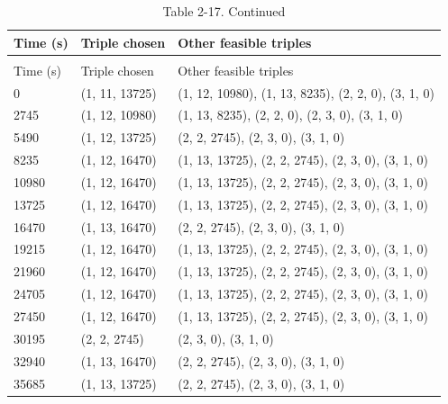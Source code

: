 \documentclass[../main.tex]{subfiles}
\begin{document}
\begin{longtable}[h!t!]{p{0.6in}p{1in}p{4.4in}}
    \caption{Duplicate of Previous table, using longtables environment.}\label{tbl2}\\%
    \hline {{Time (s)}} & {{Triple chosen}} & {{Other feasible triples}}\\ \hline \endfirsthead%
    \hline\endfoot%
    \caption*{Table 2-17. Continued} \\%
    \hline{{Time (s)}} & {{Triple chosen}} & {{Other feasible triples}}\\ \hline \endhead%
0 & (1, 11, 13725) & (1, 12, 10980), (1, 13, 8235), (2, 2, 0), (3, 1, 0)\\
2745 & (1, 12, 10980) & (1, 13, 8235), (2, 2, 0), (2, 3, 0), (3, 1, 0) \\
5490 & (1, 12, 13725) & (2, 2, 2745), (2, 3, 0), (3, 1, 0) \\
8235 & (1, 12, 16470) & (1, 13, 13725), (2, 2, 2745), (2, 3, 0), (3, 1, 0) \\
10980 & (1, 12, 16470) & (1, 13, 13725), (2, 2, 2745), (2, 3, 0), (3, 1, 0) \\
13725 & (1, 12, 16470) & (1, 13, 13725), (2, 2, 2745), (2, 3, 0), (3, 1, 0) \\
16470 & (1, 13, 16470) & (2, 2, 2745), (2, 3, 0), (3, 1, 0) \\
19215 & (1, 12, 16470) & (1, 13, 13725), (2, 2, 2745), (2, 3, 0), (3, 1, 0) \\
21960 & (1, 12, 16470) & (1, 13, 13725), (2, 2, 2745), (2, 3, 0), (3, 1, 0) \\
24705 & (1, 12, 16470) & (1, 13, 13725), (2, 2, 2745), (2, 3, 0), (3, 1, 0) \\
27450 & (1, 12, 16470) & (1, 13, 13725), (2, 2, 2745), (2, 3, 0), (3, 1, 0) \\
30195 & (2, 2, 2745) & (2, 3, 0), (3, 1, 0) \\
32940 & (1, 13, 16470) & (2, 2, 2745), (2, 3, 0), (3, 1, 0) \\
35685 & (1, 13, 13725) & (2, 2, 2745), (2, 3, 0), (3, 1, 0) \\

\end{longtable}
\end{document}
